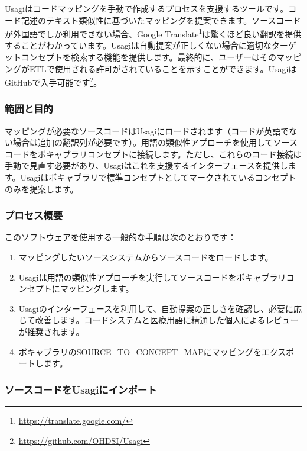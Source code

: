 \documentclass[
  11pt]{book}
\providecommand{\tightlist}{%
  \setlength{\itemsep}{0pt}\setlength{\parskip}{0pt}}
\theoremstyle{definition}
\theoremstyle{definition}
\theoremstyle{definition}
\theoremstyle{definition}
\theoremstyle{remark}
\begin{document}
Usagiはコードマッピングを手動で作成するプロセスを支援するツールです。コード記述のテキスト類似性に基づいたマッピングを提案できます。ソースコードが外国語でしか利用できない場合、Google Translate\footnote{\url{https://translate.google.com/}}は驚くほど良い翻訳を提供することがわかっています。Usagiは自動提案が正しくない場合に適切なターゲットコンセプトを検索する機能を提供します。最終的に、ユーザーはそのマッピングがETLで使用される許可がされていることを示すことができます。UsagiはGitHubで入手可能です\footnote{\url{https://github.com/OHDSI/Usagi}}。  

\subsubsection{範囲と目的}\label{ux7bc4ux56f2ux3068ux76eeux7684-2}

マッピングが必要なソースコードはUsagiにロードされます（コードが英語でない場合は追加の翻訳列が必要です）。用語の類似性アプローチを使用してソースコードをボキャブラリコンセプトに接続します。ただし、これらのコード接続は手動で見直す必要があり、Usagiはこれを支援するインターフェースを提供します。Usagiはボキャブラリで標準コンセプトとしてマークされているコンセプトのみを提案します。

\subsubsection{プロセス概要}\label{ux30d7ux30edux30bbux30b9ux6982ux8981-2}

このソフトウェアを使用する一般的な手順は次のとおりです：

\begin{enumerate}
\def\labelenumi{\arabic{enumi}.}
\tightlist
\item
  マッピングしたいソースシステムからソースコードをロードします。
\item
  Usagiは用語の類似性アプローチを実行してソースコードをボキャブラリコンセプトにマッピングします。
\item
  Usagiのインターフェースを利用して、自動提案の正しさを確認し、必要に応じて改善します。コードシステムと医療用語に精通した個人によるレビューが推奨されます。
\item
  ボキャブラリのSOURCE\_TO\_CONCEPT\_MAPにマッピングをエクスポートします。
\end{enumerate}

\subsubsection{ソースコードをUsagiにインポート}\label{ux30bdux30fcux30b9ux30b3ux30fcux30c9ux3092usagiux306bux30a4ux30f3ux30ddux30fcux30c8}
\end{document}
